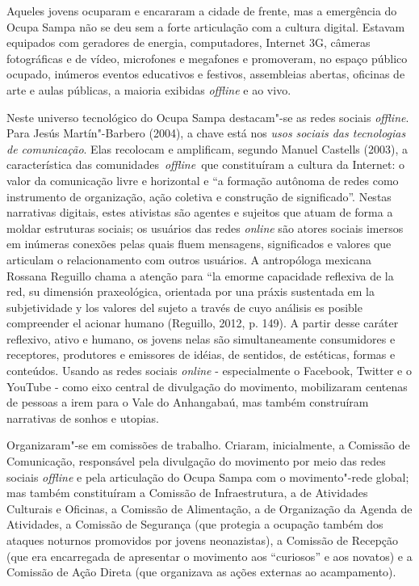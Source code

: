 Aqueles jovens ocuparam e encararam a cidade de frente, mas a
emergência do Ocupa Sampa não se deu sem a forte articulação com a
cultura digital. Estavam equipados com geradores de energia,
computadores, Internet 3G, câmeras fotográficas e de vídeo, microfones e
megafones e promoveram, no espaço público ocupado, inúmeros eventos
educativos e festivos, assembleias abertas, oficinas de arte e aulas
públicas, a maioria exibidas \emph{\emph{offline}} e ao vivo.

Neste universo tecnológico do Ocupa Sampa destacam"-se as redes sociais
\emph{offline}. Para Jesús Martín"-Barbero (2004), a chave está nos \emph{usos
sociais das tecnologias de comunicação}. Elas recolocam e amplificam,
segundo Manuel Castells (2003), a característica das
comunidades~\emph{\emph{offline}}~que constituíram a cultura da Internet: o
valor da comunicação livre e horizontal e ``a formação autônoma de redes
como instrumento de organização, ação coletiva e construção de
significado''. Nestas narrativas digitais, estes ativistas são
agentes e sujeitos que atuam de forma a moldar estruturas sociais; os
usuários das redes \emph{\emph{\emph{online}}} são atores sociais imersos em
inúmeras conexões pelas quais fluem mensagens, significados e valores
que articulam o relacionamento com outros usuários. A antropóloga
mexicana Rossana Reguillo chama a atenção para ``la emorme capacidade
reflexiva de la red, su dimensión praxeológica, orientada por una práxis
sustentada em la subjetividade y los valores del sujeto a través de cuyo
análisis es posible compreender el acionar humano (Reguillo, 2012, p.
149). A partir desse caráter reflexivo, ativo e humano, os jovens
nelas  são simultaneamente consumidores e receptores, produtores e
emissores de idéias, de sentidos, de estéticas, formas e conteúdos.
Usando as redes sociais \emph{\emph{online}} - especialmente o Facebook, Twitter e o
YouTube - como eixo central de divulgação do movimento, mobilizaram
centenas de pessoas a irem para o Vale do Anhangabaú, mas também
construíram narrativas de sonhos e utopias.

Organizaram"-se em comissões de trabalho. Criaram, inicialmente, a
Comissão de Comunicação, responsável pela divulgação do movimento por
meio das redes sociais \emph{\emph{offline}} e pela articulação do Ocupa Sampa
com o movimento"-rede global; mas também constituíram a Comissão de
Infraestrutura, a de Atividades Culturais e Oficinas, a Comissão de
Alimentação, a de Organização da Agenda de Atividades, a Comissão de
Segurança (que protegia a ocupação também dos ataques noturnos
promovidos por jovens neonazistas), a Comissão de Recepção (que era
encarregada de apresentar o movimento aos ``curiosos'' e aos novatos) e
a Comissão de Ação Direta (que organizava as ações externas ao
acampamento).

